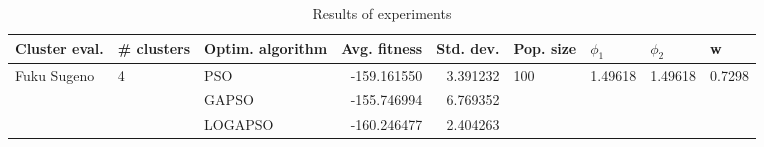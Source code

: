 \begin{table}
\centering
\caption{Results of experiments}
\begin{tabular}{lllrrllll}
\toprule
               Cluster eval. &        \# clusters & Optim. algorithm &  Avg. fitness &  Std. dev. &            Pop. size &               $\phi_{1}$ &               $\phi_{2}$ &                       w \\
\midrule
\multirow{3}{*}{Fuku Sugeno} & \multirow{3}{*}{4} &              PSO &   -159.161550 &   3.391232 & \multirow{3}{*}{100} & \multirow{3}{*}{1.49618} & \multirow{3}{*}{1.49618} & \multirow{3}{*}{0.7298} \\
                             &                    &            GAPSO &   -155.746994 &   6.769352 &                      &                          &                          &                         \\
                             &                    &          LOGAPSO &   -160.246477 &   2.404263 &                      &                          &                          &                         \\
\bottomrule
\end{tabular}
\end{table}
